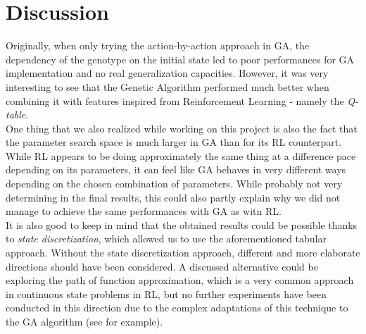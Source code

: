 \section{Discussion}
Originally, when only trying the action-by-action approach in GA, the dependency of the genotype on the initial state led to poor performances for GA implementation and no real generalization capacities.
However, it was very interesting to see that the Genetic Algorithm performed much better when combining it with features inspired from Reinforcement Learning - namely the \textit{Q-table}.
\\
One thing that we also realized while working on this project is also the fact that the parameter search space is much larger in GA than for its RL counterpart. 
While RL appears to be doing approximately the same thing at a difference pace depending on its parameters, it can feel like GA behaves in very different ways depending on the chosen combination of parameters.
While probably not very determining in the final results, this could also partly explain why we did not manage to achieve the same performances with GA as witn RL.
\\
It is also good to keep in mind that the obtained results could be possible thanks to \textit{state discretization}, which allowed us to use the aforementioned tabular approach.
Without the state discretization approach, different and more elaborate directions should have been considered. 
A discussed alternative could be exploring the path of function approximation, which is a very common approach in continuous state problems in RL, 
but no further experiments have been conducted in this direction due to the complex adaptations of this technique to the GA algorithm (see \cite[NEAT]{stanley2002NEAT} for example).
